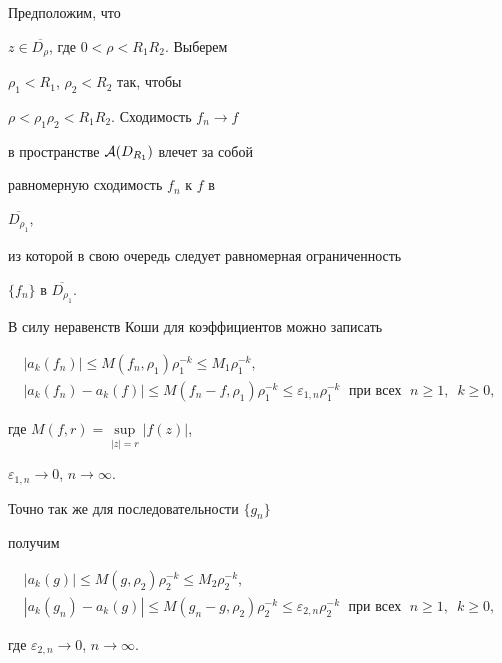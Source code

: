 \begin{pf}


Предположим, что 


$z \in\overline{D_{\rho}}$, где $0<\rho<R_1 R_2$. Выберем


$\rho_1 < R_1$, $\rho_2 < R_2$ так, чтобы 


$\rho < \rho_1 \rho_2 <R_1 R_2$. Сходимость $f_n \to f$ 


в пространстве ${\cal A}(D_{R_1})$ влечет за собой


равномерную сходимость $f_n$ к $f$ в 


$\overline{D_{\rho_1}}$, 


из которой в свою очередь следует равномерная ограниченность 


$\{ f_n \}$ в $\overline{D_{\rho_1}}$. 


В силу неравенств Коши для коэффициентов можно записать


\begin{gather}


|a_k(f_n)| \le M(f_n ,\rho_1) \rho_1^{-k} \le M_1 \rho_1^{-k}, \\


%


|a_k(f_n) - a_k (f)| \le M(f_n -f ,\rho_1)\rho_1^{-k} 


\le \varepsilon_{1,n} \rho_1^{-k} \;\text{ при всех }\; n \ge 1, 


\ \; k \ge 0,


\end{gather}


где $M(f,r)= \sup\limits_{|z|=r} |f(z)|$,


$\varepsilon_{1,n} \to 0$, $n \to\infty$. 


Точно так же для последовательности $\{ g_n \}$ 


получим


\begin{gather}


|a_k (g)| \le M(g,\rho_2) \rho_2^{-k} \le M_2 \rho_2^{-k}, \\


%


|a_k (g_n) - a_k (g)| \le M(g_n -g ,\rho_2)\rho_2^{-k} 


\le \varepsilon_{2,n} \rho_2^{-k} \;\text{ при всех }\; n \ge 1,


\ \; k \ge 0,


\end{gather}


где $\varepsilon_{2,n} \to 0$, $n \to\infty$.






\end{pf}
